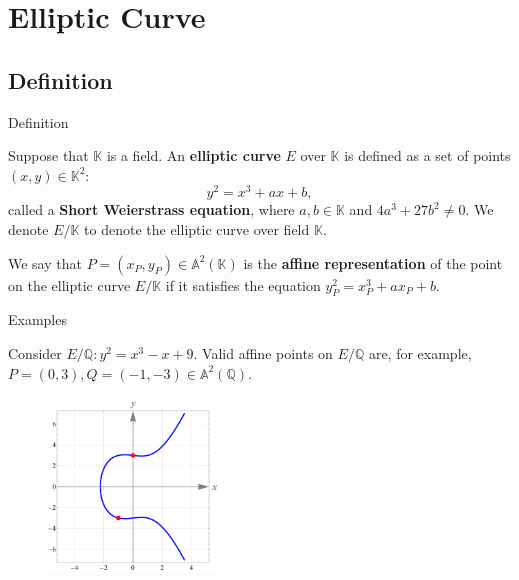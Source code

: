 \documentclass{beamer}
\begin{document}
    \section{Elliptic Curve}

    \subsection{Definition}
    \begin{frame}{Definition}
        
        \begin{definition}
            Suppose that $\mathbb{K}$ is a field. An \textbf{elliptic curve} $E$ over $\mathbb{K}$ is defined as a set of points $(x,y) \in \mathbb{K}^2$:
            \begin{equation*}
                y^2 = x^3+ax+b,
            \end{equation*}
            called a \textbf{Short Weierstrass equation}, where $a,b \in \mathbb{K}$ and $4a^3+27b^2 \neq 0$. We denote $E/\mathbb{K}$ to denote the elliptic curve over field $\mathbb{K}$.\pause
        \end{definition}

        \begin{definition}
            We say that $P=(x_P,y_P) \in \mathbb{A}^2(\mathbb{K})$ is the \textbf{affine representation} of the point on the elliptic curve $E/\mathbb{K}$ if it satisfies the equation $y_P^2=x_P^3+ax_P+b$.
        \end{definition}
    \end{frame}

    \begin{frame}{Examples}
        \begin{example}
            Consider $E/\mathbb{Q}: y^2=x^3-x+9$. Valid affine points on $E/\mathbb{Q}$ are, for example, $P=(0,3), Q=(-1,-3) \in \mathbb{A}^2(\mathbb{Q})$.
        
            \begin{figure}
                \centering
                \includegraphics[width=0.4\textwidth]{images/lecture_3/ec_illustration_1.pdf}
                \label{fig:ec_1}
            \end{figure}
        \end{example}
    \end{frame}
\end{document}
